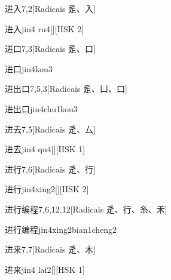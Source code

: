\begin{entry}{进入}{7,2}[Radicais ⾡、⼊]
  \begin{phonetics}{进入}{jin4 ru4}[][HSK 2]
  \end{phonetics}
\end{entry}

\begin{entry}{进口}{7,3}[Radicais ⾡、⼝]
  \begin{phonetics}{进口}{jin4kou3}
  \end{phonetics}
\end{entry}

\begin{entry}{进出口}{7,5,3}[Radicais ⾡、⼐、⼝]
  \begin{phonetics}{进出口}{jin4chu1kou3}
  \end{phonetics}
\end{entry}

\begin{entry}{进去}{7,5}[Radicais ⾡、⼛]
  \begin{phonetics}{进去}{jin4 qu4}[][HSK 1]
  \end{phonetics}
\end{entry}

\begin{entry}{进行}{7,6}[Radicais ⾡、⾏]
  \begin{phonetics}{进行}{jin4xing2}[][HSK 2]
  \end{phonetics}
\end{entry}

\begin{entry}{进行编程}{7,6,12,12}[Radicais ⾡、⾏、⽷、⽲]
  \begin{phonetics}{进行编程}{jin4xing2bian1cheng2}
  \end{phonetics}
\end{entry}

\begin{entry}{进来}{7,7}[Radicais ⾡、⽊]
  \begin{phonetics}{进来}{jin4 lai2}[][HSK 1]
  \end{phonetics}
\end{entry}

